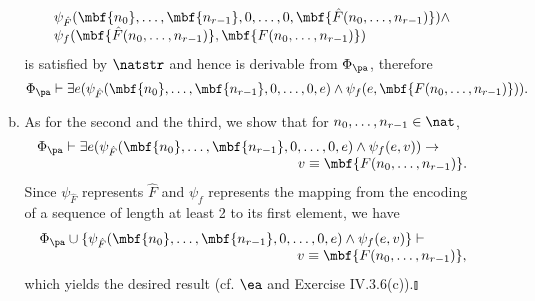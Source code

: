 \begin{enumerate}[(1)]
\begin{enumerate}[(a)]
\[
\begin{array}{l}
\psi_{\hat{F}}(\mbf{n_0}, \ldots, \mbf{n_{r - 1}}, 0, \ldots, 0, \mbf{\hat{F}(n_0, \ldots, n_{r - 1})}) \land \cr
\psi_f(\mbf{\hat{F}(n_0, \ldots, n_{r - 1})}, \mbf{F(n_0, \ldots, n_{r - 1})})
\end{array}
\]
is satisfied by $\natstr$ and hence is derivable from $\Phi_\pa$, therefore
\[
\Phi_\pa \vdash \exists e (\psi_{\hat{F}}(\mbf{n_0}, \ldots, \mbf{n_{r - 1}}, 0, \ldots, 0, e) \land \psi_f(e, \mbf{F(n_0, \ldots, n_{r - 1})})).
\]
\item As for the second and the third, we show that for $n_0, \ldots, n_{r - 1} \in \nat$,
\[
\begin{array}{l}
\Phi_\pa \vdash \exists e (\psi_{\hat{F}}(\mbf{n_0}, \ldots, \mbf{n_{r - 1}}, 0, \ldots, 0, e) \land \psi_f(e, v)) \rightarrow \ \ \ \ \ \ \cr
\multicolumn{1}{r}{v \equiv \mbf{F(n_0, \ldots, n_{r - 1})}.}
\end{array}
\]
Since $\psi_{\hat{F}}$ represents $\hat{F}$ and $\psi_f$ represents the mapping from the encoding of a sequence of length at least 2 to its first element, we have
\[
\begin{array}{l}
\Phi_\pa \cup \{ \psi_{\hat{F}}(\mbf{n_0}, \ldots, \mbf{n_{r - 1}}, 0, \ldots, 0, e) \land \psi_f(e, v) \} \vdash \ \ \ \ \ \ \ \ \ \cr
\multicolumn{1}{r}{v \equiv \mbf{F(n_0, \ldots, n_{r - 1})},}
\end{array}
\]
which yields the desired result (cf. $\ea$ and Exercise IV.3.6(c)).\nolinebreak\hfill$\talloblong$
\end{enumerate}
\end{enumerate}